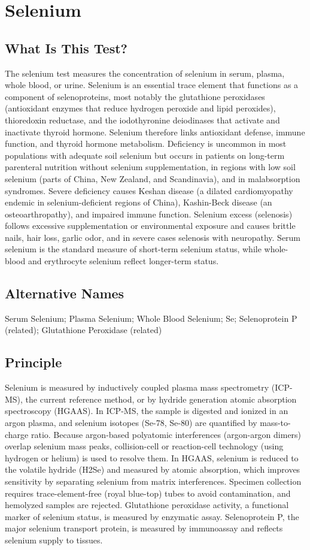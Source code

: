 \chapter{Selenium}

\section*{What Is This Test?}
The selenium test measures the concentration of selenium in serum, plasma, whole blood, or urine. Selenium is an essential trace element that functions as a component of selenoproteins, most notably the glutathione peroxidases (antioxidant enzymes that reduce hydrogen peroxide and lipid peroxides), thioredoxin reductase, and the iodothyronine deiodinases that activate and inactivate thyroid hormone. Selenium therefore links antioxidant defense, immune function, and thyroid hormone metabolism. Deficiency is uncommon in most populations with adequate soil selenium but occurs in patients on long-term parenteral nutrition without selenium supplementation, in regions with low soil selenium (parts of China, New Zealand, and Scandinavia), and in malabsorption syndromes. Severe deficiency causes Keshan disease (a dilated cardiomyopathy endemic in selenium-deficient regions of China), Kashin-Beck disease (an osteoarthropathy), and impaired immune function. Selenium excess (selenosis) follows excessive supplementation or environmental exposure and causes brittle nails, hair loss, garlic odor, and in severe cases selenosis with neuropathy. Serum selenium is the standard measure of short-term selenium status, while whole-blood and erythrocyte selenium reflect longer-term status.

\section*{Alternative Names}
Serum Selenium; Plasma Selenium; Whole Blood Selenium; Se; Selenoprotein P (related); Glutathione Peroxidase (related)

\section*{Principle}
Selenium is measured by inductively coupled plasma mass spectrometry (ICP-MS), the current reference method, or by hydride generation atomic absorption spectroscopy (HGAAS). In ICP-MS, the sample is digested and ionized in an argon plasma, and selenium isotopes (Se-78, Se-80) are quantified by mass-to-charge ratio. Because argon-based polyatomic interferences (argon-argon dimers) overlap selenium mass peaks, collision-cell or reaction-cell technology (using hydrogen or helium) is used to resolve them. In HGAAS, selenium is reduced to the volatile hydride (H2Se) and measured by atomic absorption, which improves sensitivity by separating selenium from matrix interferences. Specimen collection requires trace-element-free (royal blue-top) tubes to avoid contamination, and hemolyzed samples are rejected. Glutathione peroxidase activity, a functional marker of selenium status, is measured by enzymatic assay. Selenoprotein P, the major selenium transport protein, is measured by immunoassay and reflects selenium supply to tissues.

